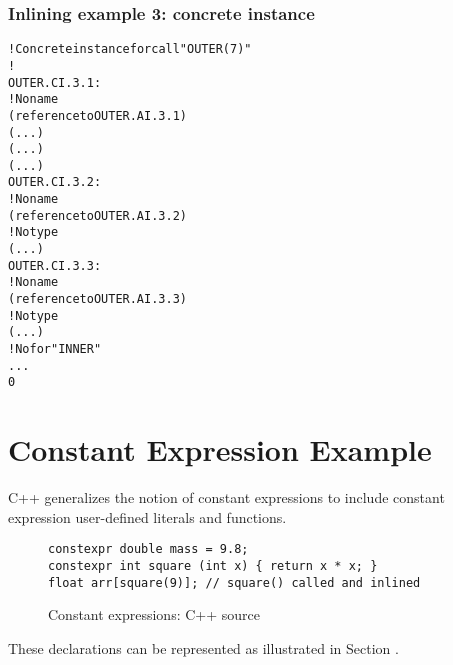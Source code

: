 \subsubsection{Inlining example 3: concrete instance}
\label{app:inliningexample3concreteinstance}
\begin{alltt}
    ! Concrete instance for call "OUTER(7)"
    ! 
OUTER.CI.3.1:
        ! No name
        (reference to OUTER.AI.3.1)
        (...)
        (...)
        (...)
OUTER.CI.3.2:
            ! No name
            (reference to OUTER.AI.3.2)
            ! No type
            (...)
OUTER.CI.3.3:
            ! No name
            (reference to OUTER.AI.3.3)
            ! No type
            (...)
        ! No  for "INNER"
        ...
        0
\end{alltt}

\section{Constant Expression Example}
\label{app:constantexpressionexample}
C++ generalizes the notion of constant expressions to include
constant expression user-defined literals and functions.

\begin{figure}[here]
\begin{lstlisting}
constexpr double mass = 9.8;
constexpr int square (int x) { return x * x; }
float arr[square(9)]; // square() called and inlined
\end{lstlisting}
\caption{Constant expressions: C++ source} \label{fig:constantexpressionscsource}
\end{figure}

These declarations can be represented as illustrated in 
Section .

